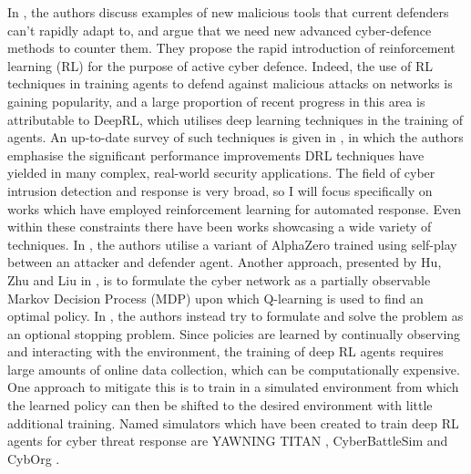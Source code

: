 \documentclass{article}
\begin{document}
In \cite{dhir2021prospective}, the authors discuss examples of new malicious tools that current defenders can’t rapidly adapt to, and argue that we need new advanced cyber-defence methods to counter them. They propose the rapid introduction of reinforcement learning (RL) for the purpose of active cyber defence. Indeed, the use of RL techniques in training agents to defend against malicious attacks on networks is gaining popularity, and a large proportion of recent progress in this area is attributable to DeepRL, which utilises deep learning techniques in the training of agents. An up-to-date survey of such techniques is given in \cite{sewak2022deep}, in which the authors emphasise the significant performance improvements DRL techniques have yielded in many complex, real-world security applications. The field of cyber intrusion detection and response is very broad, so I will focus specifically on works which have employed reinforcement learning for automated response. Even within these constraints there have been works showcasing a wide variety of techniques. In \cite{gabirondo2021towards}, the authors utilise a variant of AlphaZero trained using self-play between an attacker and defender agent. Another approach, presented by Hu, Zhu and Liu in \cite{hu2020adaptive}, is to formulate the cyber network as a partially observable Markov Decision Process (MDP) upon which Q-learning is used to find an optimal policy. In \cite{hammar2021learning}, the authors instead try to formulate and solve the problem as an optional stopping problem. Since policies are learned by continually
observing and interacting with the environment, the training of deep RL agents requires large amounts of online data collection, which can be computationally expensive.
One approach to mitigate this is to train in a simulated
environment from which the learned policy can then be shifted to the desired environment with little additional training. Named simulators which have been created to train deep RL agents for cyber threat response are YAWNING TITAN \cite{andrew2022developing}, CyberBattleSim \cite{blum2021gamifying} and CybOrg \cite{standen2021cyborg}. 
\end{document}
